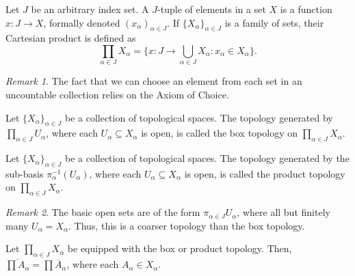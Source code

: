 \documentclass[11pt]{article}
\theoremstyle{definition}
\theoremstyle{remark}
\newtheorem*{remark}{Remark}
\numberwithin{equation}{section}
\begin{document}
    \begin{definition}
        Let $J$ be an arbitrary index set. A $J$-tuple of elements in a set $X$ is a
        function $x\colon J \to X$, formally denoted $(x_\alpha)_{\alpha \in J}$.
        If $\{X_\alpha\}_{\alpha \in J}$ is a family of sets, their Cartesian product
        is defined as \[
            \prod_{\alpha \in J} X_\alpha = \{x\colon J \to \bigcup_{\alpha \in J}
            X_\alpha\colon x_\alpha \in X_\alpha\}.
        \] 
        \begin{remark}
            The fact that we can choose an element from each set in an uncountable
            collection relies on the Axiom of Choice.
        \end{remark}
    \end{definition}

    \begin{definition}
        Let $\{X_\alpha\}_{\alpha \in J}$ be a collection of topological spaces. The
        topology generated by $\prod_{\alpha \in J} U_\alpha$, where each $U_\alpha
        \subseteq X_\alpha$ is open, is called the box topology on $\prod_{\alpha \in
        J} X_\alpha$.
    \end{definition}
    
    \begin{definition}
        Let $\{X_\alpha\}_{\alpha \in J}$ be a collection of topological spaces. The
        topology generated by the sub-basis $\pi_\alpha^{-1}(U_\alpha)$, where each
        $U_\alpha \subseteq X_\alpha$ is open, is called the product
        topology on $\prod_{\alpha \in J} X_\alpha$.

        \begin{remark}
            The basic open sets are of the form $\pi_{\alpha \in J} U_\alpha$, where
            all but finitely many $U_\alpha = X_\alpha$. Thus, this is a coarser
            topology than the box topology.
        \end{remark}
    \end{definition}

    \begin{lemma}
        Let $\prod_{\alpha \in J}X_\alpha$ be equipped with the box or product
        topology. Then, $\overline{\prod A_\alpha} = \prod \overline{A}_\alpha$,
        where each $A_\alpha \in X_\alpha$.
    \end{lemma}
    
\end{document}
